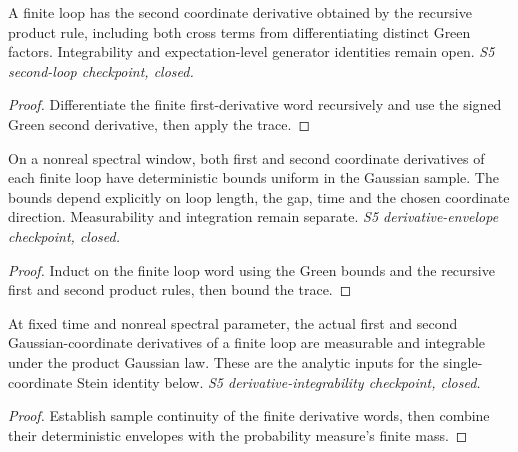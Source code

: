 \begin{lemma}
  \label{lem:loop-coordinate-second}
  \leanok
  A finite loop has the second coordinate derivative obtained by the
  recursive product rule, including both cross terms from differentiating
  distinct Green factors. Integrability and expectation-level generator
  identities remain open. \emph{S5 second-loop checkpoint, closed.}
\end{lemma}
\begin{proof}\leanok
  Differentiate the finite first-derivative word recursively and use the
  signed Green second derivative, then apply the trace.
\end{proof}

\begin{lemma}
  \label{lem:loop-coordinate-derivative-bounds}
  \leanok
  On a nonreal spectral window, both first and second coordinate derivatives
  of each finite loop have deterministic bounds uniform in the Gaussian
  sample. The bounds depend explicitly on loop length, the gap, time and the
  chosen coordinate direction. Measurability and integration remain separate.
  \emph{S5 derivative-envelope checkpoint, closed.}
\end{lemma}
\begin{proof}\leanok
  Induct on the finite loop word using the Green bounds and the recursive
  first and second product rules, then bound the trace.
\end{proof}

\begin{lemma}
  \label{lem:loop-coordinate-integrable}
  \leanok
  At fixed time and nonreal spectral parameter, the actual first and second
  Gaussian-coordinate derivatives of a finite loop are measurable and
  integrable under the product Gaussian law. These are the analytic inputs
  for the single-coordinate Stein identity below.
  \emph{S5 derivative-integrability checkpoint, closed.}
\end{lemma}
\begin{proof}\leanok
  Establish sample continuity of the finite derivative words, then combine
  their deterministic envelopes with the probability measure's finite mass.
\end{proof}


